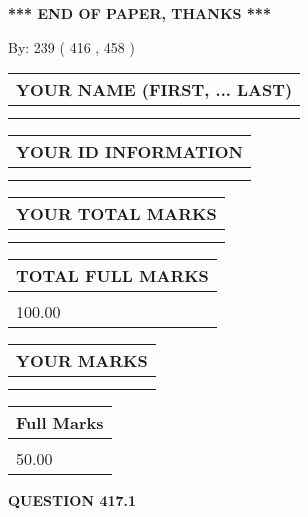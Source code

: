 \documentclass[12pt]{article}
\begin{document}
 
   
   
\vspace{1.0in} 
{\textbf{\large{ *** END OF PAPER, THANKS *** }}} 
   
   
\hspace{1.0in} By: 
 239 ( 416 ,  458 )
   
   
   
   
\newpage 
\setcounter{page}{ 
   417001 } 
   
   
   
   
\noindent\begin{tabular}{|l|}
\hline
YOUR NAME (FIRST, ... LAST)  \\
\hline
 \\ 
 \\ 
\hline
\end{tabular}
\hspace{0.05in} \begin{tabular}{|l|}
\hline
 YOUR   ID   INFORMATION  \\
\hline
 \\ 
 \\ 
\hline
\end{tabular}
   
   
\vspace{0.2in}\noindent\begin{tabular}{|l|}
\hline
YOUR TOTAL MARKS  \\
\hline
 \\ 
 \\ 
\hline
\end{tabular}
\hspace{0.05in} \begin{tabular}{|l|}
\hline
TOTAL FULL MARKS  \\
\hline
 \\ 
100.00 \\
\hline
\end{tabular}
  
\vspace{0.2in}
  
\noindent\begin{tabular}{|l|}
\hline
 YOUR MARKS  \\
\hline
 \\ 
 \\ 
\hline
\end{tabular}
\hspace{0.05in} \begin{tabular}{|l|}
\hline
 Full Marks  \\
\hline
 \\ 
50.00 \\
\hline
\end{tabular}
{\textbf{\Large{QUESTION
417.1 
}}}
  
\end{document}
